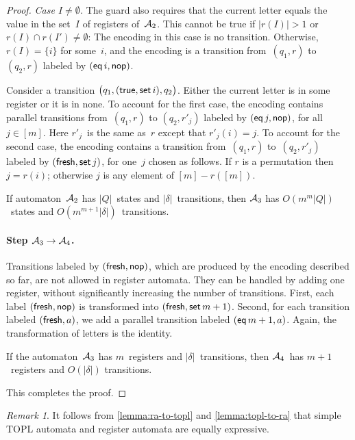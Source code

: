 \documentclass[9pt, preprint]{sigplanconf} %
\theoremstyle{definition}
\theoremstyle{remark}
\newtheorem{remark}{Remark}
\begin{document}
\begin{proof}
\emph{Case $I\ne\emptyset$.}\quad
The guard also requires that the current letter equals the value in the set~$I$ of registers of~${\cal A}_2$.
This cannot be true if $|r(I)|>1$ or $r(I)\cap r(I')\ne\emptyset$: The encoding in this case is no transition.
Otherwise, $r(I)=\{i\}$ for some~$i$, and the encoding is a transition from~$(q_1,r)$ to~$(q_2,r)$ labeled by $({\sf eq}\,i,{\sf nop})$.

\smallskip
Consider a transition $\bigl(q_1,({\sf true},{\sf set}\,i),q_2\bigr)$.
Either the current letter is in some register or it is in none.
To account for the first case, the encoding contains parallel transitions from~$(q_1,r)$ to $(q_2,r'_j)$ labeled by $({\sf eq}\,j,{\sf nop})$, for all $j\in[m]$.
Here $r'_j$~is the same as~$r$ except that $r'_j(i)=j$.
To account for the second case, the encoding contains a transition from~$(q_1,r)$ to~$(q_2,r'_j)$ labeled by $({\sf fresh},{\sf set}\,j)$, for one~$j$ chosen as follows.
If $r$ is a permutation then $j=r(i)$; otherwise $j$ is any element of $[m]-r([m])$.

\smallskip
If automaton~${\cal A}_2$ has $|Q|$~states and $|\delta|$~transitions, then ${\cal A}_3$ has $O(m^m|Q|)$~states and $O(m^{m+1}|\delta|)$~transitions.

\paragraph{Step ${\cal A}_3\to{\cal A}_4$.}
Transitions labeled by $({\sf fresh},{\sf nop})$, which are produced by the encoding described so far, are not allowed in register automata.
They can be handled by adding one register, without significantly increasing the number of transitions.
First, each label $({\sf fresh},{\sf nop})$ is transformed into $({\sf fresh},{\sf set}\,m+1)$.
Second, for each transition labeled $({\sf fresh},a)$, we add a parallel transition labeled $({\sf eq}\,m+1,a)$.
Again, the transformation of letters is the identity.

If the automaton~${\cal A}_3$ has $m$~registers and $|\delta|$~transitions, then ${\cal A}_4$~has $m+1$~registers and $O(|\delta|)$ transitions.

\smallskip
This completes the proof.
\end{proof}

\begin{remark}
It follows from \autoref{lemma:ra-to-topl} and \autoref{lemma:topl-to-ra} that simple TOPL automata and register automata are equally expressive.
\end{remark}
\end{document}
